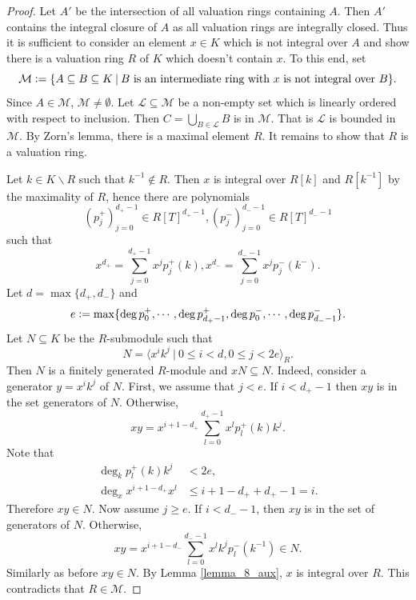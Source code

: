 \documentclass[8pt]{article}
\numberwithin{equation}{section}
\newcommand{\defeq}{\vcentcolon=}
\newcommand{\sep}[0]{\:|\:}
\begin{document}
\begin{proof}
    Let $A'$ be the intersection of all valuation rings containing $A$. Then $A'$ contains the integral closure of $A$ as all valuation rings are integrally closed. Thus it is sufficient to consider an element $x\in K$ which is not integral over $A$ and show there is a valuation ring $R$ of $K$ which doesn't contain $x$.
    To this end, set 
    \begin{equation*}
        \mathcal{M}\defeq \{A\subseteq B\subseteq K\sep\text{$B$ is an intermediate ring with $x$ is not integral over $B$}\}.
    \end{equation*}
    Since $A\in\mathcal{M}$, $\mathcal{M}\not=\emptyset$. Let $\mathcal{L}\subseteq\mathcal{M}$ be a non-empty set which is linearly ordered with respect to inclusion. Then $C=\bigcup_{B\in\mathcal{L}}B$ is in $\mathcal{M}$. That is $\mathcal{L}$ is bounded in $\mathcal{M}$.
    By Zorn's lemma, there is a maximal element $R$. It remains to show that $R$ is a valuation ring.
    \par Let $k\in K\backslash R$ such that $k^{-1}\not\in R$. Then $x$ is integral over $R[k]$ and $R[k^{-1}]$ by the maximality of $R$, hence there are polynomials 
    \begin{equation*}
        (p_j^+)_{j=0}^{d_+-1}\in R[T]^{d_+-1},(p_j^-)_{j=0}^{d_--1}\in R[T]^{d_--1}
    \end{equation*}
    such that 
    \begin{equation*}
        x^{d_+} = \sum_{j=0}^{d_+-1}x^jp_j^{+}(k),x^{d_-} = \sum_{j=0}^{d_--1}x^jp_j^{-}(k^-).
    \end{equation*}
    Let $d = \max\{d_+,d_-\}$ and 
    \begin{equation*}
        e \defeq \max\{\deg p_0^+,\cdots,\deg p_{d_+-1}^+,\deg p_0^-,\cdots,\deg p_{d_--1}^-\}.
    \end{equation*}
    Let $N\subseteq K$ be the $R$-submodule such that 
    \begin{equation*}
        N = \langle x^ik^j\sep 0\leq i<d, 0\leq j<2e\rangle_R.
    \end{equation*}
     Then $N$ is a finitely generated $R$-module
    and $xN\subseteq N$. Indeed, consider a generator $y=x^ik^j$ of $N$. First, we assume that $j<e$. If $i<d_+-1$ then $xy$ is in the set generators of $N$. Otherwise, 
    \begin{equation*}
        xy = x^{i+1-d_+}\sum_{l=0}^{d_+-1}x^lp_l^{+}(k)k^j.
    \end{equation*}
    Note that 
    \begin{align*}
        \deg_kp_l^+(k)k^j &<2e,\\
         \deg_x x^{i+1-d_+}x^l  &\leq  i+1-d_++d_+-1 = i.
    \end{align*}
    Therefore $xy\in N$.
    Now assume $j\geq e$. If $i<d_--1$, then $xy$ is in the set of generators of $N$. Otherwise, 
    \begin{equation*}
        xy = x^{i+1-d_-}\sum_{l=0}^{d_--1}x^lk^j p_l^{-}(k^{-1})\in N.
    \end{equation*}
    Similarly as before $xy\in N$. By Lemma \ref{lemma_8_aux}, $x$ is integral over $R$. This contradicts that $R\in\mathcal{M}$.
\end{proof}
\end{document}
